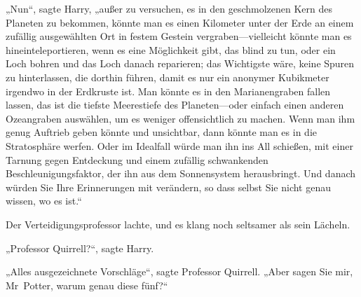 „Nun“, sagte Harry, „außer zu versuchen, es in den geschmolzenen Kern des Planeten zu bekommen, könnte man es einen Kilometer unter der Erde an einem zufällig ausgewählten Ort in festem Gestein vergraben—vielleicht könnte man es hineinteleportieren, wenn es eine Möglichkeit gibt, das blind zu tun, oder ein Loch bohren und das Loch danach reparieren; das Wichtigste wäre, keine Spuren zu hinterlassen, die dorthin führen, damit es nur ein anonymer Kubikmeter irgendwo in der Erdkruste ist. Man könnte es in den Marianengraben fallen lassen, das ist die tiefste Meerestiefe des Planeten—oder einfach einen anderen Ozeangraben auswählen, um es weniger offensichtlich zu machen. Wenn man ihm genug Auftrieb geben könnte und unsichtbar, dann könnte man es in die Stratosphäre werfen. Oder im Idealfall würde man ihn ins All schießen, mit einer Tarnung gegen Entdeckung und einem zufällig schwankenden Beschleunigungsfaktor, der ihn aus dem Sonnensystem herausbringt. Und danach würden Sie Ihre Erinnerungen mit  verändern, so dass selbst Sie nicht genau wissen, wo es ist.“

Der Verteidigungsprofessor lachte, und es klang noch seltsamer als sein Lächeln.

„Professor Quirrell?“, sagte Harry.

„Alles ausgezeichnete Vorschläge“, sagte Professor Quirrell. „Aber sagen Sie mir, Mr~Potter, warum genau diese fünf?“

